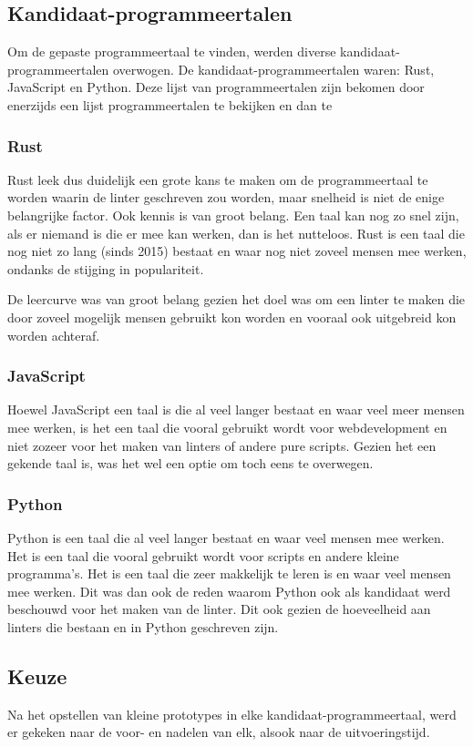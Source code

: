 \subsection{Kandidaat-programmeertalen}
Om de gepaste programmeertaal te vinden, werden diverse kandidaat-programmeertalen overwogen. De kandidaat-programmeertalen waren: Rust, JavaScript en Python.
Deze lijst van programmeertalen zijn bekomen door enerzijds een lijst programmeertalen te bekijken en dan te

\subsubsection{Rust}
Rust leek dus duidelijk een grote kans te maken om de programmeertaal te worden waarin de linter geschreven zou worden, maar snelheid is niet de enige belangrijke factor. Ook kennis is van groot belang. Een taal kan nog zo snel zijn, als er niemand is die er mee kan werken, dan is het nutteloos. Rust is een taal die nog niet zo lang (sinds 2015) bestaat en waar nog niet zoveel mensen mee werken, ondanks de stijging in populariteit.

De leercurve was van groot belang gezien het doel was om een linter te maken die door zoveel mogelijk mensen gebruikt kon worden en vooraal ook uitgebreid kon worden achteraf.

\subsubsection{JavaScript}
Hoewel JavaScript een taal is die al veel langer bestaat en waar veel meer mensen mee werken, is het een taal die vooral gebruikt wordt voor webdevelopment en niet zozeer voor het maken van linters of andere pure scripts. Gezien het een gekende taal is, was het wel een optie om toch eens te overwegen.

\subsubsection{Python}
Python is een taal die al veel langer bestaat en waar veel mensen mee werken. Het is een taal die vooral gebruikt wordt voor scripts en andere kleine programma's. Het is een taal die zeer makkelijk te leren is en waar veel mensen mee werken. Dit was dan ook de reden waarom Python ook als kandidaat werd beschouwd voor het maken van de linter. Dit ook gezien de hoeveelheid aan linters die bestaan en in Python geschreven zijn.

\subsection{Keuze}
Na het opstellen van kleine prototypes in elke kandidaat-programmeertaal, werd er gekeken naar de voor- en nadelen van elk, alsook naar de uitvoeringstijd.
